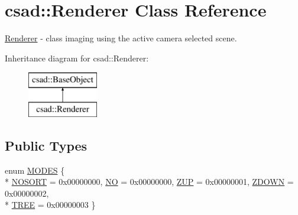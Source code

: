 \hypertarget{classcsad_1_1_renderer}{\section{csad\-:\-:Renderer Class Reference}
\label{classcsad_1_1_renderer}
}


\hyperlink{classcsad_1_1_renderer}{Renderer} -\/ class imaging using the active camera selected scene.  


Inheritance diagram for csad\-:\-:Renderer\-:\begin{figure}[H]
\begin{center}
\leavevmode
\includegraphics[height=2.000000cm]{classcsad_1_1_renderer}
\end{center}
\end{figure}
\subsection*{Public Types}
\begin{DoxyCompactItemize}
\item 
enum \hyperlink{classcsad_1_1_renderer_a112fd7f69525df52f65b47a62975538e}{M\-O\-D\-E\-S} \{ \\*
\hyperlink{classcsad_1_1_renderer_a112fd7f69525df52f65b47a62975538ead80d7d6b6aa720dc4bd7c630d93b976c}{N\-O\-S\-O\-R\-T} = 0x00000000, 
\hyperlink{classcsad_1_1_renderer_a112fd7f69525df52f65b47a62975538eaab6c6e6b28cdb5e5e5406d48ae44bade}{N\-O} = 0x00000000, 
\hyperlink{classcsad_1_1_renderer_a112fd7f69525df52f65b47a62975538ea2e4ee71bce65ed333a87b7abc851713c}{Z\-U\-P} = 0x00000001, 
\hyperlink{classcsad_1_1_renderer_a112fd7f69525df52f65b47a62975538eab78079ebc6178ac578d3f4fa65307d18}{Z\-D\-O\-W\-N} = 0x00000002, 
\\*
\hyperlink{classcsad_1_1_renderer_a112fd7f69525df52f65b47a62975538ead968921d8dd219f43c22fc612ef515b8}{T\-R\-E\-E} = 0x00000003
 \}
\end{DoxyCompactItemize}
